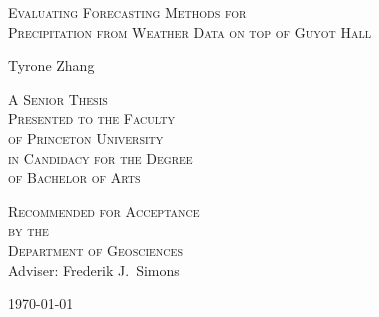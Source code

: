 \thispagestyle{empty}
  \begin{center}
    \textsc{\LARGE Evaluating Forecasting Methods for\\ Precipitation from Weather Data on top of Guyot Hall } %
  \end{center}
  \vspace{.6in}
  \begin{center}
      Tyrone Zhang
  \end{center}
  \vspace{.6in}
  \begin{center}
    \textsc{A Senior Thesis \\ %
    Presented to the Faculty \\
    of Princeton University \\
    in Candidacy for the Degree \\
    of Bachelor of Arts}
  \end{center}
  \vspace{.3in}
  \begin{center}
    \textsc{Recommended for Acceptance \\
    by the \\Department of  Geosciences \\}
    Adviser: Frederik J.~Simons
  \end{center}
  \vspace{.3in}
  \begin{center}
  \today
  \end{center}
  
  \clearpage
